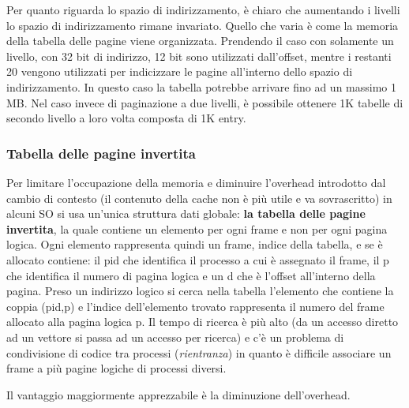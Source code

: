 \documentclass{article}
\begin{document}
 \noindent Per quanto riguarda lo spazio di indirizzamento, è chiaro che aumentando i livelli lo spazio di indirizzamento rimane invariato.
 Quello che varia è come la memoria della tabella delle pagine viene organizzata. 
 Prendendo il caso con solamente un livello, con 32 bit di indirizzo, 12 bit sono utilizzati dall'offset, mentre i restanti 20 vengono utilizzati
 per indicizzare le pagine all'interno dello spazio di indirizzamento. In questo caso la tabella potrebbe arrivare fino ad un massimo 1 MB.
 Nel caso invece di paginazione a due livelli, è possibile ottenere 1K tabelle di secondo livello a loro volta composta di 1K entry.

 \subsubsection{Tabella delle pagine invertita}

 Per limitare l'occupazione della memoria e diminuire l'overhead introdotto dal cambio di contesto (il contenuto della cache non è più utile e va 
 sovrascritto) in alcuni SO si usa un'unica struttura dati globale: \textbf{la tabella delle pagine invertita}, la quale contiene un elemento
 per ogni frame e non per ogni pagina logica.
 Ogni elemento rappresenta quindi un frame, indice della tabella, e se è allocato contiene: il pid che identifica il 
 processo a cui è assegnato il frame, il p che identifica il numero di pagina logica e un d che è l'offset all'interno della pagina.
 Preso un indirizzo logico si cerca nella tabella l'elemento che contiene la coppia (pid,p) e l'indice dell'elemento trovato rappresenta il 
 numero del frame allocato alla pagina logica p. Il tempo di ricerca è più alto (da un accesso diretto ad un vettore si passa ad un accesso
 per ricerca) e c'è un problema di condivisione di codice tra processi (\textit{rientranza}) in quanto è difficile associare un frame a
 più pagine logiche di processi diversi.

 \noindent Il vantaggio maggiormente apprezzabile è la diminuzione dell'overhead.
\end{document}

